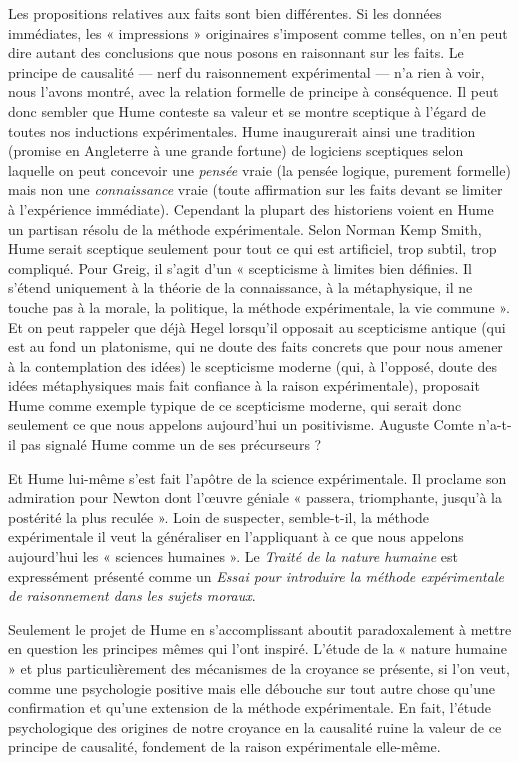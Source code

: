Les propositions relatives aux faits sont bien différentes.
Si les données immédiates, les « impressions » originaires
s'imposent comme telles, on n’en peut dire autant des
conclusions que nous posons en raisonnant sur les faits.
Le principe de causalité — nerf du raisonnement expérimental — 
n’a rien à voir, nous l’avons montré, avec la
relation formelle de principe à conséquence. Il peut donc
sembler que Hume conteste sa valeur et se montre sceptique 
à l'égard de toutes nos inductions expérimentales.
Hume inaugurerait ainsi une tradition (promise en Angleterre 
à une grande fortune) de logiciens sceptiques selon
laquelle on peut concevoir une {\it pensée} vraie (la pensée
logique, purement formelle) mais non une {\it connaissance}
vraie (toute affirmation sur les faits devant se limiter à
l’expérience immédiate). Cependant la plupart des historiens 
voient en Hume un partisan résolu de la méthode
expérimentale. Selon Norman Kemp Smith, Hume serait
sceptique seulement pour tout ce qui est artificiel, trop
subtil, trop compliqué. Pour Greig, il s’agit d’un « scepticisme
à limites bien définies. Il s’étend uniquement à
la théorie de la connaissance, à la métaphysique, il ne
touche pas à la morale, la politique, la méthode expérimentale, 
la vie commune ». Et on peut rappeler que déjà
Hegel lorsqu’il opposait au scepticisme antique (qui est
au fond un platonisme, qui ne doute des faits concrets
que pour nous amener à la contemplation des idées) le
scepticisme moderne (qui, à l’opposé, doute des idées
métaphysiques mais fait confiance à la raison expérimentale), 
proposait Hume comme exemple typique de ce
scepticisme moderne, qui serait donc seulement ce que
nous appelons aujourd’hui un positivisme. Auguste Comte
n’a-t-il pas signalé Hume comme un de ses précurseurs ?

Et Hume lui-même s’est fait l’apôtre de la science
expérimentale. Il proclame son admiration pour Newton
dont l’œuvre géniale « passera, triomphante, jusqu’à la
postérité la plus reculée ». Loin de suspecter, semble-t-il,
la méthode expérimentale il veut la généraliser en l’appliquant 
à ce que nous appelons aujourd’hui les « sciences
humaines ». Le {\it Traité de la nature humaine} est expressément
présenté comme un {\it Essai pour introduire la méthode expérimentale 
de raisonnement dans les sujets moraux}.

Seulement le projet de Hume en s’accomplissant aboutit
paradoxalement à mettre en question les principes mêmes
qui l’ont inspiré. L’étude de la « nature humaine » et plus
particulièrement des mécanismes de la croyance se présente, 
si l’on veut, comme une psychologie positive mais
elle débouche sur tout autre chose qu’une confirmation
et qu’une extension de la méthode expérimentale. En
fait, l'étude psychologique des origines de notre croyance
en la causalité ruine la valeur de ce principe de causalité,
fondement de la raison expérimentale elle-même.

